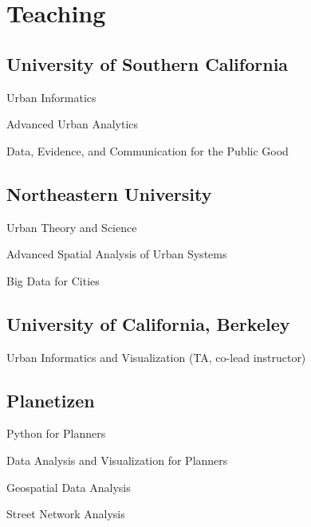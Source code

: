 \documentclass[12pt,letterpaper]{report}
\newcommand{\listitemspace}{0.25em}
\renewenvironment{itemize}
{\begin{list}{}{\setlength{\leftmargin}{0em}
                \setlength{\parskip}{0em}
                \setlength{\itemsep}{\listitemspace}
                \setlength{\parsep}{\listitemspace}}}
{\end{list}}
\begin{document}
    \section*{Teaching}

    \subsection*{University of Southern California}

    \begin{itemize}

        \item Urban Informatics
        \item Advanced Urban Analytics
        \item Data, Evidence, and Communication for the Public Good

    \end{itemize}

    \subsection*{Northeastern University}

    \begin{itemize}

        \item Urban Theory and Science
        \item Advanced Spatial Analysis of Urban Systems
        \item Big Data for Cities

    \end{itemize}

    \subsection*{University of California, Berkeley}

    \begin{itemize}

        \item Urban Informatics and Visualization (TA, co-lead instructor)

    \end{itemize}

    \subsection*{Planetizen}

    \begin{itemize}

        \item Python for Planners
        \item Data Analysis and Visualization for Planners
        \item Geospatial Data Analysis
        \item Street Network Analysis

    \end{itemize}
\end{document}
